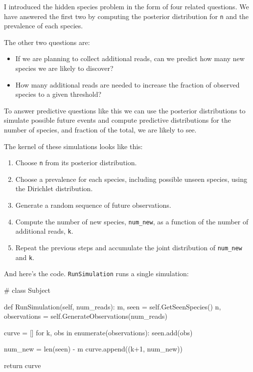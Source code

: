 \documentclass[12pt]{book}
\theoremstyle{exercise}
\newcommand{\py}[1]{{\tt #1}}%
\begin{document}
I introduced the hidden species problem in the form of four related
questions.  We have answered the first two by computing the posterior
distribution for \py{n} and the prevalence of each species.

The other two questions are:

\begin{itemize}

\item If we are planning to collect additional reads, can we predict
  how many new species we are likely to discover?

\item How many additional reads are needed to increase the
  fraction of observed species to a given threshold?

\end{itemize}

To answer predictive questions like this we can use the posterior
distributions to simulate possible future events and compute
predictive distributions for the number of species, and fraction of
the total, we are likely to see.

The kernel of these simulations looks like this:

\begin{enumerate}

\item Choose \py{n} from its posterior distribution.

\item Choose a prevalence for each species, including possible unseen
  species, using the Dirichlet distribution.

\item Generate a random sequence of future observations.

\item Compute the number of new species, \verb"num_new", as a function
  of the number of additional reads, \py{k}.

\item Repeat the previous steps and accumulate the joint distribution
  of \verb"num_new" and \py{k}.

\end{enumerate}

And here's the code.  \py{RunSimulation} runs a single simulation:

\begin{code}
# class Subject

    def RunSimulation(self, num_reads):
        m, seen = self.GetSeenSpecies()
        n, observations = self.GenerateObservations(num_reads)

        curve = []
        for k, obs in enumerate(observations):
            seen.add(obs)

            num_new = len(seen) - m
            curve.append((k+1, num_new))

        return curve
\end{code}
\end{document}
